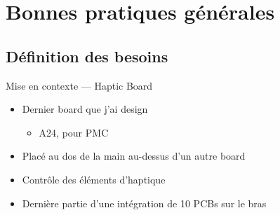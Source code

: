 
\section{Bonnes pratiques générales}

\subsection{Définition des besoins}

\begin{frame}{Mise en contexte --- Haptic Board}
    \begin{twocolumns}
        \leftcol
        \begin{itemize}
            \item Dernier board que j'ai design
            \begin{itemize}
                \item A24, pour PMC
            \end{itemize}
            \item Placé au dos de la main au-dessus d'un autre board
            \item Contrôle des éléments d'haptique
            \item Dernière partie d'une intégration de 10 PCBs sur le bras
        \end{itemize}
        \rightcol
    \end{twocolumns}
\end{frame}

